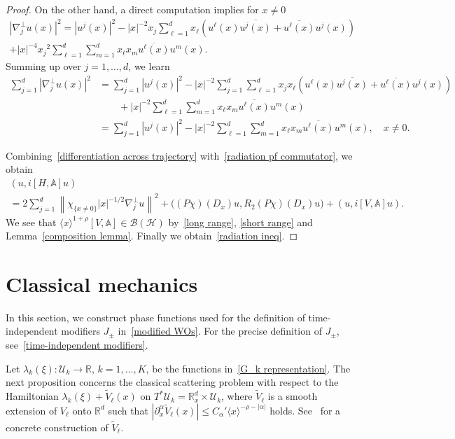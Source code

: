 \documentclass[AHL,Unicode,longabstracts,published]{cedram}
\renewcommand{\a}{\alpha}
\renewcommand{\l}{\lambda}
\newcommand{\x}{\xi}
\newcommand{\R}{\mathbb{R}}
\newcommand{\bbA}{\mathbb{A}}
\newcommand{\HS}{\mathcal{H}}
\newcommand{\US}{\mathcal{U}}
\newcommand{\BS}{\mathcal{B}}
\newcommand{\la}{\langle}
\newcommand{\ra}{\rangle}
\newcommand{\jap}[1]{\langle #1 \rangle}
\newcommand{\R}{\mathbb{R}}
\newcommand{\HS}{\mathcal{H}}
\begin{document}
\begin{proof}
On the other hand, a direct computation implies for $x\neq0$
\begin{multline*}
\left| \nabla_{j}^\perp u (x) \right|^2 
= \left|u^j(x)\right|^2 - |x|^{-2} x_j \sum_{\ell=1}^d x_\ell \left(u^\ell(x)\overline{u^j(x)}+\overline{u^\ell(x)}u^j(x) \right) \\
+ |x|^{-4} {x_j}^2 \sum_{\ell=1}^d \sum_{m=1}^d x_\ell x_m \overline{u^\ell(x)}u^m(x).
\end{multline*}
Summing up over $j=1,\dots,d$, we learn
\begin{equation}\label{differentiation across trajectory}
\begin{split}
\sum_{j=1}^d \left| \nabla_{j}^\perp u (x) \right|^2 
&= \sum_{j=1}^d \left|u^j(x)\right|^2 - |x|^{-2} \sum_{j=1}^d \sum_{\ell=1}^d x_j x_\ell \left(u^\ell(x)\overline{u^j(x)}+\overline{u^\ell(x)}u^j(x) \right) \\
& \qquad + |x|^{-2} \sum_{\ell=1}^d \sum_{m=1}^d x_\ell x_m \overline{u^\ell(x)}u^m(x) \\
&= \sum_{j=1}^d \left|u^j(x)\right|^2 - |x|^{-2} \sum_{\ell=1}^d \sum_{m=1}^d x_\ell x_m \overline{u^\ell(x)}u^m(x), \quad x\neq0.
\end{split}
\end{equation}

Combining~\eqref{differentiation across trajectory} with~\eqref{radiation pf commutator}, we obtain
\begin{multline*}
\left(u, i[H,\bbA]u\right)\\
= 2\sum_{j=1}^d \left\| \chi_{\{x\neq0\}}|x|^{-1/2} \nabla_{j}^\perp u \right\|^2 
+ \bigl((P\chi)(D_x)u, R_2 (P\chi)(D_x)u\bigr) + (u, i[V,\bbA] u).
\end{multline*}
We see that $\jap{x}^{1+\rho} [V,\bbA] \in \BS(\HS)$ by~\eqref{long range}, \eqref{short range} and Lemma~\ref{composition lemma}. Finally we obtain~\eqref{radiation ineq}.
\end{proof}


\section{Classical mechanics}\label{classical section}

In this section, we construct phase functions used for the definition of time-independent modifiers $J_\pm$ in~\eqref{modified WOs}. For the precise definition of $J_\pm$, see~\eqref{time-independent modifiers}.

Let $\l_k(\x):\US_k\to\R$, $k=1,\dots,K$, be the functions in~\eqref{G_k representation}. The next proposition concerns the classical scattering problem with respect to the Hamiltonian $\l_k(\x)+\tilde V_\ell(x)$ on $T^*\US_k=\R_x^d\times\US_k$, where $\tilde V_\ell$ is a smooth extension of $V_\ell$ onto $\R^d$ such that $|\partial_x^\a \tilde V_\ell(x)|\leq C_\a' \la x \ra^{-\rho-|\a|}$ holds. See~\cite[Lemma~2.1]{N} for a concrete construction of $\tilde V_\ell$.
\end{document}
